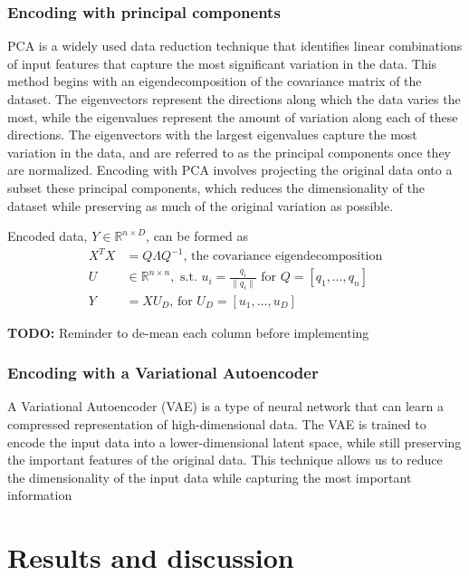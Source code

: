 \documentclass[10pt,twocolumn,letterpaper]{article}
\begin{document}
\subsubsection{Encoding with principal components}
PCA is a widely used data reduction technique that identifies linear combinations of input features that capture the most significant variation in the data. This method begins with an eigendecomposition of the covariance matrix of the dataset. The eigenvectors represent the directions along which the data varies the most, while the eigenvalues represent the amount of variation along each of these directions. The eigenvectors with the largest eigenvalues capture the most variation in the data, and are referred to as the principal components once they are normalized. Encoding with PCA involves projecting the original data onto a subset these principal components, which reduces the dimensionality of the dataset while preserving as much of the original variation as possible.

Encoded data, $Y \in \mathbb{R}^{n\times D}$, can be formed as 
\begin{align*}
    X^TX &= Q\Lambda Q^{-1} \textrm{, the covariance eigendecomposition}\\
    U &\in \mathbb{R}^{n\times n}, \textrm{ s.t. } u_i = \frac{q_i}{\lVert q_i \rVert} \textrm{ for } Q = [q_1, \dots, q_n]\\
    Y &= XU_D \textrm{, for } U_D = [u_1, \dots, u_D]
\end{align*}

\textbf{TODO:} Reminder to de-mean each column before implementing

\subsubsection{Encoding with a Variational Autoencoder}
A Variational Autoencoder (VAE) is a type of neural network that can learn a compressed representation of high-dimensional data. The VAE is trained to encode the input data into a lower-dimensional latent space, while still preserving the important features of the original data. This technique allows us to reduce the dimensionality of the input data while capturing the most important information \cite{odaibo2019tutorial}


\section{Results and discussion}
\label{sec:results}
\end{document}
